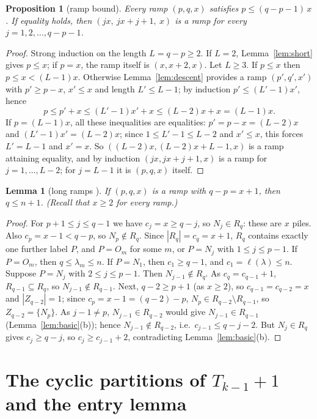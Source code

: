 \documentclass[11pt]{article}
\newtheorem{lemma}[theorem]{Lemma}
\newtheorem{proposition}[theorem]{Proposition}
\theoremstyle{definition}
\newcommand{\R}{R}
\renewcommand{\le}{\leqslant}
\renewcommand{\ge}{\geqslant}
\begin{document}
\begin{proposition}[ramp bound]\label{prop:rampbound}
Every ramp $(p,q,x)$ satisfies $p\le(q-p-1)\,x$.  If equality holds, then $(jx,\ jx+j+1,\ x)$ is a ramp
for every $j=1,2,\dots,q-p-1$.
\end{proposition}
\begin{proof}
Strong induction on the length $L=q-p\ge2$.  If $L=2$, Lemma~\ref{lem:short} gives $p\le x$; if $p=x$, the
ramp itself is $(x,x+2,x)$.  Let $L\ge3$.  If $p\le x$ then $p\le x<(L-1)x$.  Otherwise
Lemma~\ref{lem:descent} provides a ramp $(p',q',x')$ with $p'\ge p-x$, $x'\le x$ and length $L'\le L-1$; by
induction $p'\le(L'-1)x'$, hence
\[p\le p'+x\le(L'-1)x'+x\le(L-2)x+x=(L-1)x .\]
If $p=(L-1)x$, all these inequalities are equalities: $p'=p-x=(L-2)x$ and $(L'-1)x'=(L-2)x$; since
$1\le L'-1\le L-2$ and $x'\le x$, this forces $L'=L-1$ and $x'=x$.  So $((L-2)x,(L-2)x+L-1,x)$ is a ramp
attaining equality, and by induction $(jx,jx+j+1,x)$ is a ramp for $j=1,\dots,L-2$; for $j=L-1$ it is
$(p,q,x)$ itself.
\end{proof}

\begin{lemma}[long ramps {\cite[Lemma~3.4]{GH}}]\label{lem:long}
If $(p,q,x)$ is a ramp with $q-p=x+1$, then $q\le n+1$.  (Recall that $x\ge2$ for every ramp.)
\end{lemma}
\begin{proof}
For $p+1\le j\le q-1$ we have $c_j=x\ge q-j$, so $N_j\in \R_q$: these are $x$ piles.  Also
$c_p=x-1<q-p$, so $N_p\notin \R_q$.  Since $|\R_q|=c_q=x+1$, $\R_q$ contains exactly one further label $P$,
and $P=O_m$ for some $m$, or $P=N_j$ with $1\le j\le p-1$.
If $P=O_m$, then $q\le\lambda_m\le n$.  If $P=N_1$, then $c_1\ge q-1$, and $c_1=\ell(\lambda)\le n$.
Suppose $P=N_j$ with $2\le j\le p-1$.  Then $N_{j-1}\notin \R_q$.  As $c_q=c_{q-1}+1$, $\R_{q-1}\subseteq \R_q$, so
$N_{j-1}\notin \R_{q-1}$.  Next, $q-2\ge p+1$ (as $x\ge2$), so $c_{q-1}=c_{q-2}=x$ and $|Z_{q-2}|=1$; since
$c_p=x-1=(q-2)-p$, $N_p\in \R_{q-2}\setminus \R_{q-1}$, so $Z_{q-2}=\{N_p\}$.  As $j-1\ne p$, $N_{j-1}\in \R_{q-2}$ would give
$N_{j-1}\in \R_{q-1}$ (Lemma~\ref{lem:basic}(b)); hence $N_{j-1}\notin \R_{q-2}$, i.e.\ $c_{j-1}\le q-j-2$.  But
$N_j\in \R_q$ gives $c_j\ge q-j$, so $c_j\ge c_{j-1}+2$, contradicting Lemma~\ref{lem:basic}(b).
\end{proof}

\section{The cyclic partitions of $T_{k-1}+1$ and the entry lemma}\label{sec:entry}
\end{document}
